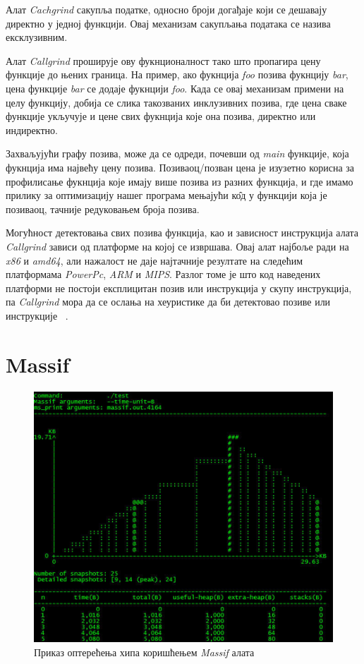 \documentclass[12pt,oneside]{memoir}
\begin{document}
\indent Алат \textit{Cachgrind} сакупља податке, односно броји догађаје који се дешавају директно у једној функцији. Овај механизам сакупљања података се назива ексклузивним.

\indent Алат \textit{Callgrind} проширује ову фукнционалност тако што пропагира цену функције до њених граница. На пример, ако фукнција \textit{foo} позива фукнцију \textit{bar}, цена функције \textit{bar} се додаје фукнцији \textit{foo}. Када се овај механизам примени на целу функцију, добија се слика такозваних инклузивних позива, где цена сваке функције укључује и цене свих фукнција које она позива, директно или индиректно.

\indent Захваљујући графу позива, може да се одреди, почевши од \textit{main} функције, која фукнција има највећу цену позива. Позиваоц/позван цена је изузетно корисна за профилисање фукнција које имају више позива из разних функција, и где имамо прилику за оптимизацију нашег програма мењајући к\^{о}д у функцији која је позиваоц, тачније редуковањем броја позива.

\indent Могућност детектовања свих позива функција, као и зависност инструкција алата  \textit{Callgrind} зависи од платформе на којој се извршава. Овај алат најбоље ради на \textit{x86} и \textit{amd64}, али нажалост не даје најтачније резултате на следећим платформама \textit{PowerPc}, \textit{ARM} и \textit{MIPS}. Разлог томе је што код наведених платформи не постоји експлицитан позив или инструкција у скупу инструкција, па  \textit{Callgrind} мора да се ослања на хеуристике да би детектовао позиве или инструкције ~\cite{callgrindRef}.


\section{Massif}
\label{section_massif}

\begin{figure}[h!]
\begin{center}
\includegraphics[scale=0.75]{slika19.png}
\end{center}
\caption{Приказ оптерећења хипа коришћењем \textit{Massif} алата}
\label{fig:massif}
\end{figure}
\end{document}
